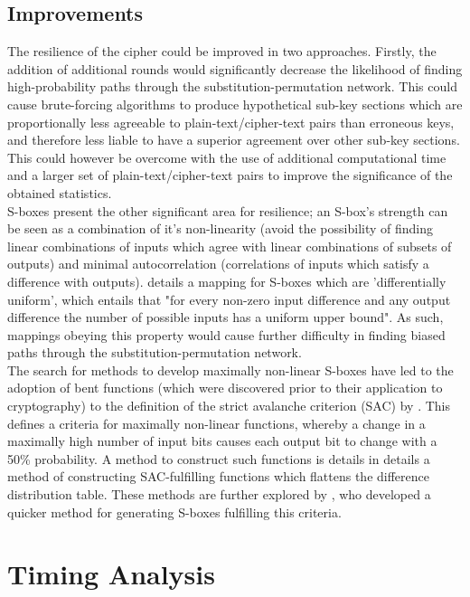 \documentclass[british,11pt,a4paper]{article}
\begin{document}
\subsection{Improvements}
The resilience of the cipher could be improved in two approaches. Firstly, the addition of additional rounds would significantly decrease the likelihood of finding high-probability paths through the substitution-permutation network. This could cause brute-forcing algorithms to produce hypothetical sub-key sections which are proportionally less agreeable to plain-text/cipher-text pairs than erroneous keys, and therefore less liable to have a superior agreement over other sub-key sections. This could however be overcome with the use of additional computational time and a larger set of plain-text/cipher-text pairs to improve the significance of the obtained statistics.
\\  
S-boxes present the other significant area for resilience; an S-box's strength can be seen as a combination of it's non-linearity (avoid the possibility of finding linear combinations of inputs which agree with linear combinations of subsets of outputs) and minimal autocorrelation (correlations of inputs which satisfy a difference with outputs). \citet{nyberg} details a mapping for S-boxes which are 'differentially uniform', which entails that "for every non-zero input difference and any output difference the number of possible inputs has a uniform upper bound". As such, mappings obeying this property would cause further difficulty in finding biased paths through the substitution-permutation network.  
\\
The search for methods to develop maximally non-linear S-boxes have led to the adoption of bent functions (which were discovered prior to their application to cryptography) to the definition of the strict avalanche criterion (SAC) by \citet{Forre1990-ll}. This defines a criteria for maximally non-linear functions, whereby a change in a maximally high number of input bits causes each output bit to change with a 50\% probability. A method to construct such functions is details in \citeauthor{Forre1990-ll} details a method of constructing SAC-fulfilling functions which flattens the difference distribution table. These methods are further explored by \citet{Adams1990-nz}, who developed a quicker method for generating S-boxes fulfilling this criteria.


\clearpage
\section{Timing Analysis}
\end{document}
